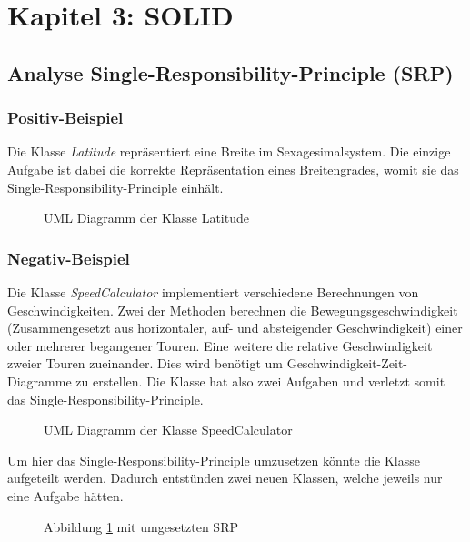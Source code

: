 \section{Kapitel 3: SOLID}

\subsection{Analyse Single-Responsibility-Principle (SRP)}

\subsubsection{Positiv-Beispiel}
 
Die Klasse \textit{Latitude} repräsentiert eine Breite im Sexagesimalsystem.
Die einzige Aufgabe ist dabei die korrekte Repräsentation eines Breitengrades, womit sie das Single-Responsibility-Principle einhält.

\begin{figure}[h]
  \centering
  
  \caption{UML Diagramm der Klasse Latitude}
\end{figure}

\subsubsection{Negativ-Beispiel}

Die Klasse \textit{SpeedCalculator} implementiert verschiedene Berechnungen von Geschwindigkeiten.
Zwei der Methoden berechnen die Bewegungsgeschwindigkeit (Zusammengesetzt aus horizontaler, auf- und absteigender Geschwindigkeit) einer oder mehrerer begangener Touren.
Eine weitere die relative Geschwindigkeit zweier Touren zueinander. Dies wird benötigt um Geschwindigkeit-Zeit-Diagramme zu erstellen.
Die Klasse hat also zwei Aufgaben und verletzt somit das Single-Responsibility-Principle.

\begin{figure}[h]
 \label{fig:shitSRP}
  \centering
  
  \caption{UML Diagramm der Klasse SpeedCalculator}
\end{figure}

Um hier das Single-Responsibility-Principle umzusetzen könnte die Klasse aufgeteilt werden.
Dadurch entstünden zwei neuen Klassen, welche jeweils nur eine Aufgabe hätten.

\begin{figure}[h]
  \label{fig:betterSRP}
  \centering
  
  \caption{Abbildung \ref{fig:shitSRP} mit umgesetzten SRP}
\end{figure}


